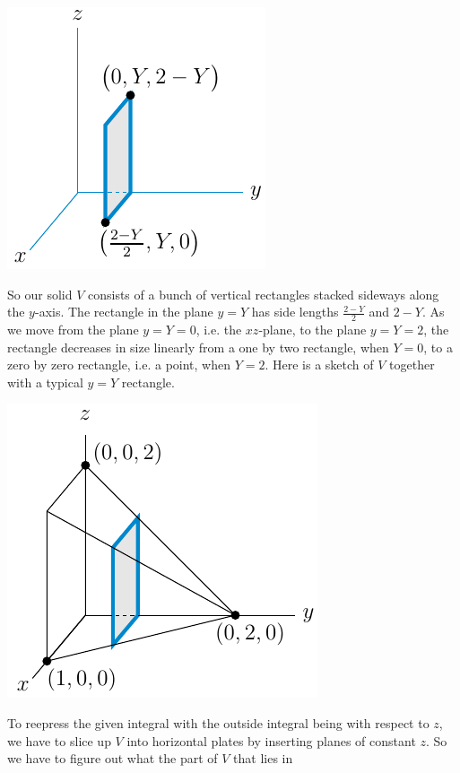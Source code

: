 \begin{eg}
\begin{efig}
\begin{center}
    \includegraphics{figs_integration/xchange5.pdf}
\end{center}
\end{efig}
So our solid $V$ consists of a bunch of vertical rectangles stacked sideways along the $y$-axis. The rectangle in the plane $y=Y$ has side lengths
$\frac{2-Y}{2}$ and $2-Y$. As we move from the plane $y=Y=0$, i.e. the $xz$-plane, to the plane $y=Y=2$, the rectangle decreases in size linearly 
from a one by two rectangle, when $Y=0$, to a zero by zero rectangle, 
i.e. a point, when $Y=2$.
Here is a sketch of $V$ together with a typical $y=Y$ rectangle.
\begin{efig}
\begin{center}
    \includegraphics{figs_integration/xchange4.pdf}
\end{center}
\end{efig}
To reepress the given integral with the outside integral being with respect to $z$, we have to slice up $V$ into horizontal plates by inserting planes 
of constant $z$. So we have to figure out what the part of $V$ that lies in 

\end{eg}
